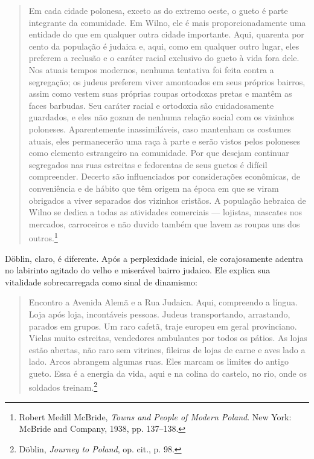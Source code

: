 \begin{quote}
Em cada cidade polonesa, exceto as do extremo oeste, o gueto é parte
integrante da comunidade. Em Wilno, ele é mais proporcionadamente uma
entidade do que em qualquer outra cidade importante. Aqui, quarenta por
cento da população é judaica e, aqui, como em qualquer outro lugar, eles
preferem a reclusão e o caráter racial exclusivo do gueto à vida fora
dele. Nos atuais tempos modernos, nenhuma tentativa foi feita contra a
segregação; os judeus preferem viver amontoados em seus próprios
bairros, assim como vestem suas próprias roupas ortodoxas pretas e
mantêm as faces barbudas. Seu caráter racial e ortodoxia são
cuidadosamente guardados, e eles não gozam de nenhuma relação social com
os vizinhos poloneses. Aparentemente inassimiláveis, caso mantenham os
costumes atuais, eles permanecerão uma raça à parte e serão vistos pelos
poloneses como elemento estrangeiro na comunidade. Por que desejam
continuar segregados nas ruas estreitas e fedorentas de seus guetos é
difícil compreender. Decerto são influenciados por considerações
econômicas, de conveniência e de hábito que têm origem na época em que
se viram obrigados a viver separados dos vizinhos cristãos. A população
hebraica de Wilno se dedica a todas as atividades comerciais --- lojistas,
mascates nos mercados, carroceiros e não duvido também que lavem as
roupas uns dos outros.\footnote{Robert Medill McBride, \emph{Towns and
  People of Modern Poland}. New York: McBride and Company, 1938, pp.
  137--138.}
\end{quote}

%

Döblin, claro, é diferente. Após a perplexidade inicial, ele
corajosamente adentra no labirinto agitado do velho e miserável bairro
judaico. Ele explica sua vitalidade sobrecarregada como sinal de
dinamismo:

\begin{quote}
Encontro a Avenida Alemã e a Rua Judaica. Aqui, compreendo a língua.
Loja após loja, incontáveis pessoas. Judeus transportando, arrastando,
parados em grupos. Um raro cafetã, traje europeu em geral provinciano.
Vielas muito estreitas, vendedores ambulantes por todos os pátios. As
lojas estão abertas, não raro sem vitrines, fileiras de lojas de carne e
aves lado a lado. Arcos abrangem algumas ruas. Eles marcam os limites do
antigo gueto. Essa é a energia da vida, aqui e na colina do castelo, no
rio, onde os soldados treinam.\footnote{Döblin, \emph{Journey to
  Poland}, op. cit., p. 98.}
\end{quote}

